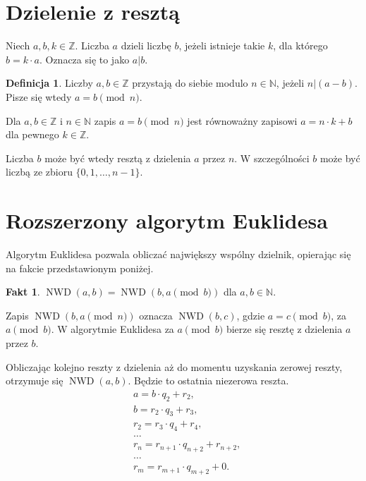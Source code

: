 \documentclass[12pt,twoside,a4]{mwbk}
\theoremstyle{definition}
\newtheorem{definicja}{Definicja}[chapter]
\newtheorem{fakt}{Fakt}[chapter]
\DeclareMathOperator{\NWD}{NWD}
\begin{document}
\section{Dzielenie z resztą}
Niech $a,b,k \in \mathbb{Z}$. Liczba $a$ dzieli liczbę $b$, jeżeli istnieje takie $k$, dla którego $b = k \cdot a$. Oznacza się to jako $a|b$.
\begin{definicja}{\cite{markowe}}
Liczby $a,b \in \mathbb{Z}$ przystają do siebie modulo $n \in \mathbb{N}$, jeżeli $n | (a - b)$. Pisze się wtedy $a = b \pmod{n}$.
\end{definicja}
Dla $a,b \in \mathbb{Z}$ i $n \in \mathbb{N}$ zapis $a = b \pmod{n}$ jest równoważny zapisowi $a = n \cdot k + b$ dla pewnego $k \in \mathbb{Z}$. \\ \par
Liczba $b$ może być wtedy resztą z dzielenia $a$ przez $n$. W szczególności $b$ może być liczbą ze zbioru $\{0,1,\ldots,n-1\}$.


\section{Rozszerzony algorytm Euklidesa}
Algorytm Euklidesa pozwala obliczać największy wspólny dzielnik, opierając się na fakcie przedstawionym poniżej.

\begin{fakt}{\cite{handbook}}
	$\NWD(a,b) = \NWD(b, a \pmod{b})$ dla $a,b \in \mathbb{N}$.
\end{fakt}

Zapis $\NWD(b, a \pmod{n})$ oznacza $\NWD(b,c)$, gdzie $a = c \pmod{b}$, za $a \pmod{b}$. W algorytmie Euklidesa za $a \pmod{b}$ bierze się resztę z dzielenia $a$ przez $b$.

Obliczając kolejno reszty z dzielenia aż do momentu uzyskania zerowej reszty, otrzymuje się $\NWD(a,b)$. Będzie to ostatnia niezerowa reszta.
\begin{equation*} \begin{aligned}
& a = b \cdot q_2 + r_2,  \\
& b = r_2 \cdot q_3 + r_3, \\
& r_2 = r_3 \cdot q_4 + r_4, \\
& \ldots \\
& r_n = r_{n+1} \cdot q_{n+2} + r_{n+2}, \\
& \ldots \\
& r_m = r_{m+1} \cdot q_{m+2} + 0.
\end{aligned} \end{equation*}
\end{document}
